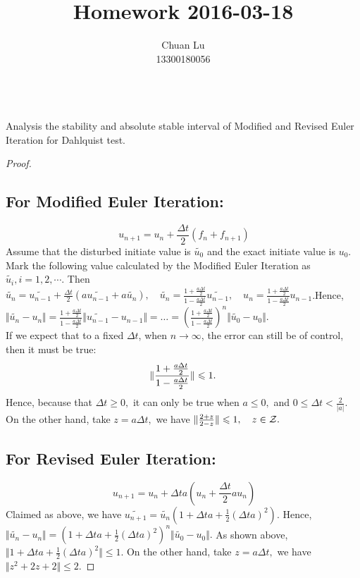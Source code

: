 \documentclass{article}
\newenvironment{problem}[2][Problem]{\begin{trivlist}
\item[\hskip \labelsep {\bfseries #1}\hskip \labelsep {\bfseries #2.}]}{\end{trivlist}}
\begin{document}
\title{Homework 2016-03-18}
\author{Chuan Lu\\
13300180056}

\maketitle

\begin{problem}{1}
\text{ }\\
Analysis the stability and absolute stable interval of Modified and Revised Euler Iteration for Dahlquist test.
\end{problem}

\begin{proof}
\subsection{For Modified Euler Iteration:} 
{\centering \[\ u_{n+1} = u_{n} + \frac{\Delta t}{2}(f_{n} + f_{n+1})\]}
\quad Assume that the disturbed initiate value is $\widetilde{u_{0}}$ and the exact initiate value is $u_{0}$. Mark the following value calculated by the Modified Euler Iteration as $\widetilde{u_{i}}, i = 1, 2, \cdots$. Then $\widetilde{u_{n}} = \widetilde{u_{n-1}} + \frac{\Delta t}{2}(a\widetilde{u_{n-1}} + a\widetilde{u_{n}}), \quad \widetilde{u_{n}} = \frac{1+\frac{a\Delta t}{2}}{1 - \frac{a\Delta t}{2}}\widetilde{u_{n-1}},\quad u_{n} = \frac{1+\frac{a\Delta t}{2}}{1 - \frac{a\Delta t}{2}}u_{n-1}$.\quad Hence, $\Vert\widetilde{u_{n}} - u_{n}\Vert =  \frac{1+\frac{a\Delta t}{2}}{1 - \frac{a\Delta t}{2}}\Vert\widetilde{u_{n-1}} - u_{n-1}\Vert = \dots = (\frac{1+\frac{a\Delta t}{2}}{1 - \frac{a\Delta t}{2}})^{n}\Vert\widetilde{u_{0}} - u_{0}\Vert.$\\
\quad If we expect that to a fixed $\Delta t$, when $n\to\infty$, the error can still be of control, then it must be true: $$\Arrowvert\frac{1+\frac{a\Delta t}{2}}{1 - \frac{a\Delta t}{2}}\Arrowvert\leqslant 1.$$ Hence, because that $\Delta t \geqslant 0,$ it can only be true when $a\leqslant 0,$ and $0\leqslant\Delta t < \frac{2}{\vert a\vert}.$\\
\quad On the other hand, take $z = a\Delta t,$ we have $\Arrowvert\frac{2+z}{2-z}\Arrowvert\leqslant 1, \quad z\in\mathcal{Z}.$

\subsection{For Revised Euler Iteration:}
{\centering \[\ u_{n+1} = u_{n} + \Delta ta(u_{n} + \frac{\Delta t}{2}au_{n})\]}
\quad Claimed as above, we have $\widetilde{u_{n+1}} = \widetilde{u_{n}}(1+\Delta ta + \frac{1}{2}(\Delta ta)^{2}).$ Hence, $\Vert\widetilde{u_{n}} - u_{n}\Vert = (1+\Delta ta + \frac{1}{2}(\Delta ta)^{2})^{n}\Vert\widetilde{u_{0}} - u_{0}\Vert.$ As shown above, $\Vert 1+\Delta ta+\frac{1}{2}(\Delta ta)^{2}\Vert\leqslant 1.$
\quad On the other hand, take $z = a\Delta t, $ we have $\Vert z^{2} + 2z + 2\Vert\leqslant 2.$
\end{proof}
\end{document}
